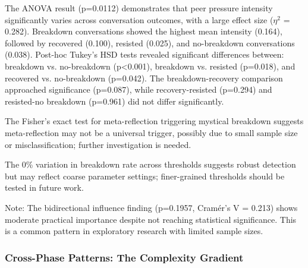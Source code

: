 \documentclass[11pt,letterpaper]{article}
\newcommand{\exponedataBidirectionalPValue}{p=0.1957}
\newcommand{\exponedataPeerPressureANOVAPValue}{p=0.0112}
\begin{document}
The ANOVA result (\exponedataPeerPressureANOVAPValue{}) demonstrates that peer pressure intensity significantly varies across conversation outcomes, with a large effect size ($\eta^2$ = 0.282). Breakdown conversations showed the highest mean intensity (0.164), followed by recovered (0.100), resisted (0.025), and no-breakdown conversations (0.038). Post-hoc Tukey's HSD tests revealed significant differences between: breakdown vs. no-breakdown (p<0.001), breakdown vs. resisted (p=0.018), and recovered vs. no-breakdown (p=0.042). The breakdown-recovery comparison approached significance (p=0.087), while recovery-resisted (p=0.294) and resisted-no breakdown (p=0.961) did not differ significantly.

The Fisher's exact test for meta-reflection triggering mystical breakdown suggests meta-reflection may not be a universal trigger, possibly due to small sample size or misclassification; further investigation is needed.

The 0\% variation in breakdown rate across thresholds suggests robust detection but may reflect coarse parameter settings; finer-grained thresholds should be tested in future work.

Note: The bidirectional influence finding (\exponedataBidirectionalPValue{}, Cramér's V = 0.213) shows moderate practical importance despite not reaching statistical significance. This is a common pattern in exploratory research with limited sample sizes.

\subsubsection{Cross-Phase Patterns: The Complexity Gradient}
\end{document}
